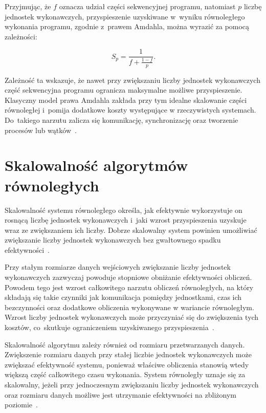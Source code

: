 Przyjmując, że $f$ oznacza udział części sekwencyjnej programu, natomiast $p$ liczbę jednostek wykonawczych, 
przyspieszenie uzyskiwane w~wyniku równoległego wykonania programu, zgodnie z~prawem Amdahla, można wyrazić za pomocą zależności:

\begin{equation}
    S_p = \frac{1}{f + \frac{1-f}{p}}.
\end{equation}

Zależność ta wskazuje, że nawet przy zwiększaniu liczby jednostek wykonawczych część sekwencyjna
programu ogranicza maksymalne możliwe przyspieszenie. Klasyczny model prawa Amdahla zakłada przy tym
idealne skalowanie części równoległej i~pomija dodatkowe koszty występujące w rzeczywistych systemach.
Do~takiego narzutu zalicza się komunikację, synchronizację oraz tworzenie procesów lub wątków~\cite{bib:KarbowskiAmdahl}.

\section{Skalowalność algorytmów równoległych}
\label{sec:SkalowalnoscAlgorytmow}

Skalowalność systemu równoległego określa, jak efektywnie wykorzystuje on rosnącą liczbę jednostek wykonawczych 
i~jaki wzrost przyspieszenia uzyskuje wraz ze zwiększaniem ich liczby. 
Dobrze skalowalny system powinien umożliwiać zwiększanie liczby jednostek wykonawczych bez gwałtownego spadku efektywności~\cite{bib:Grama}.

Przy stałym rozmiarze danych wejściowych zwiększanie liczby jednostek wykonawczych zazwyczaj powoduje stopniowe obniżanie efektywności obliczeń. 
Powodem tego jest wzrost całkowitego narzutu obliczeń równoległych, na który składają się takie czynniki jak komunikacja pomiędzy jednostkami, 
czas ich bezczynności oraz dodatkowe obliczenia wykonywane w wariancie równoległym. 
Wzrost liczby jednostek wykonawczych może przyczyniać się do zwiększenia tych kosztów, 
co~skutkuje ograniczeniem uzyskiwanego przyspieszenia~\cite{bib:Grama}.

Skalowalność algorytmu zależy również od rozmiaru przetwarzanych danych.
Zwiększenie rozmiaru danych przy stałej liczbie jednostek wykonawczych może zwiększać efektywność systemu, 
ponieważ właściwe obliczenia stanowią wtedy większą część całkowitego czasu wykonania.
System równoległy uznaje się za skalowalny, jeżeli przy jednoczesnym zwiększaniu liczby jednostek wykonawczych 
oraz rozmiaru danych możliwe jest utrzymanie efektywności na zbliżonym poziomie~\cite{bib:Grama}.

